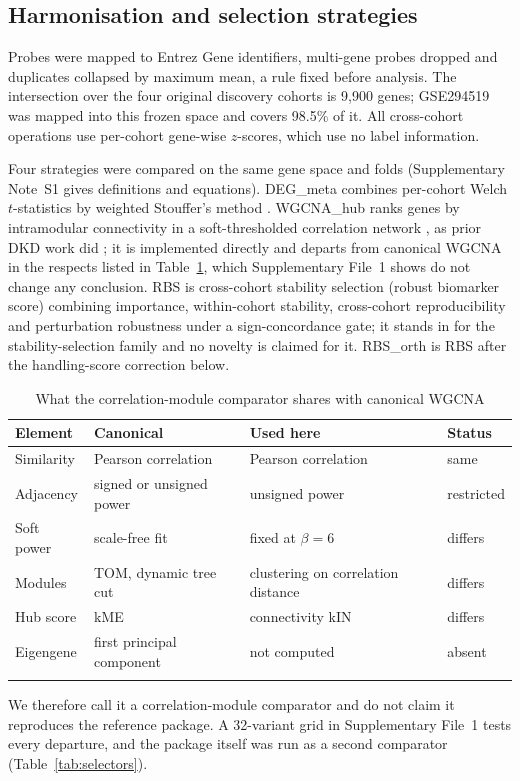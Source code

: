 \documentclass[unnumsec,webpdf,contemporary,large,numbered]{oup-authoring-template}
\begin{document}
\subsection{Harmonisation and selection strategies}\label{sec:selectors}

Probes were mapped to Entrez Gene identifiers, multi-gene probes dropped and duplicates collapsed
by maximum mean, a rule fixed before analysis. The intersection over the four original discovery
cohorts is 9,900 genes; GSE294519 was mapped into this frozen space and covers 98.5\% of it. All
cross-cohort operations use per-cohort gene-wise $z$-scores, which use no label information.

Four strategies were compared on the same gene space and folds (Supplementary Note~S1 gives
definitions and equations). DEG\_meta combines per-cohort Welch $t$-statistics by weighted
Stouffer's method \cite{whitlock2005}. WGCNA\_hub ranks genes by intramodular connectivity in a
soft-thresholded correlation network \cite{langfelder2008}, as prior DKD work did
\cite{feng2021}; it is implemented directly and departs from canonical WGCNA in the respects
listed in Table~\ref{tab:comparator}, which Supplementary File~1 shows do not change any
conclusion. RBS is cross-cohort stability selection (robust biomarker score) combining importance,
within-cohort stability, cross-cohort reproducibility and perturbation robustness under a
sign-concordance gate; it stands in for the stability-selection family \cite{meinshausen2010} and
no novelty is claimed for it. RBS\_orth is RBS after the handling-score correction below.

\begin{table}[!t]
\caption{What the correlation-module comparator shares with canonical WGCNA}\label{tab:comparator}
\tabcolsep=2pt
\begin{tabular*}{\columnwidth}{@{\extracolsep\fill}p{17mm}p{24mm}p{24mm}l@{\extracolsep\fill}}
\toprule
Element & Canonical & Used here & Status \\
\midrule
Similarity & Pearson correlation & Pearson correlation & same \\
Adjacency & signed or unsigned power & unsigned power & restricted \\
Soft power & scale-free fit & fixed at $\beta = 6$ & differs \\
Modules & TOM, dynamic tree cut & clustering on correlation distance & differs \\
Hub score & kME & connectivity kIN & differs \\
Eigengene & first principal component & not computed & absent \\
\botrule
\end{tabular*}
\begin{tablenotes}%
\item We therefore call it a correlation-module comparator and do not claim it reproduces the reference package. A 32-variant grid in Supplementary File~1 tests every departure, and the package itself was run as a second comparator (Table~\ref{tab:selectors}).
\end{tablenotes}
\end{table}
\end{document}
